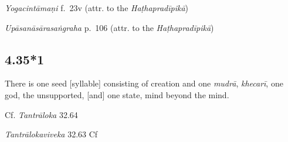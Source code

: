 \begin{ekdosis}


\begin{testimonia}[hp04_035]
\emph{Yogacintāmaṇi} f.~23v (attr. to the \emph{Haṭhapradīpikā})
\begin{versinnote}
\end{versinnote}

\emph{Upāsanāsārasaṅgraha} p.~106 (attr. to the \emph{Haṭhapradīpikā})
\begin{versinnote}
\end{versinnote}
\end{testimonia}


\subsection*{4.35*1}
\begin{translation}[hp04_035_1]
There is one seed [syllable] consisting of creation and one \emph{mudrā}, \emph{khecarī}, one god, the unsupported, [and] one state, mind beyond the mind.
\end{translation}

\begin{sources}[hp04_035_1]
Cf. \emph{Tantrāloka} 32.64
\begin{versinnote}
\end{versinnote}

\emph{Tantrālokaviveka} 32.63
Cf \begin{versinnote}
\end{versinnote}


\end{sources}
\end{ekdosis}
